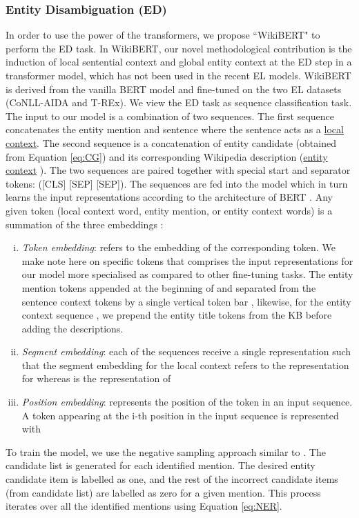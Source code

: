\documentclass[11pt,a4paper]{article}
\begin{document}
\subsubsection{Entity Disambiguation (ED)} \label{sec:entity}
In order to use the power of the transformers, we propose ``WikiBERT" to perform the ED task. In WikiBERT, our novel methodological contribution is the induction of local sentential context and global entity context at the ED step in a transformer model, which has not been used in the recent EL models. WikiBERT is derived from the vanilla BERT model and fine-tuned on the two EL datasets (CoNLL-AIDA and T-REx). 
We view the ED task as sequence classification task. The input to our model is a combination of two sequences. The first sequence  concatenates the entity mention  and sentence  where the sentence acts as a \underline{local context}. The second sequence  is a concatenation of entity candidate (obtained from Equation \ref{eq:CG}) and its corresponding Wikipedia description (\underline{entity context} ). The two sequences are paired together with special start and separator tokens: ([CLS]  [SEP]  [SEP]). The sequences are fed into the model which in turn learns the input representations according to the architecture of BERT \cite{devlin2019bert}. Any given token (local context word, entity mention, or entity context words) is a summation of the three embeddings :
\begin{enumerate}[i.]
    \item \textit{Token embedding}: refers to the embedding of the corresponding token. We make note here on specific tokens that comprises the input representations for our model more specialised as compared to other fine-tuning tasks. The entity mention tokens appended at the beginning of  and separated from the sentence context tokens by a single vertical token bar , likewise, for the entity context sequence , we prepend the entity title tokens from the KB before adding the descriptions.
    \item \textit{Segment embedding}: each of the sequences receive a single representation such that the segment embedding for the local context  refers to the representation for  whereas  is the representation of 
    
    \item \textit{Position embedding}: represents the position of the token in an input sequence. A token appearing at the i-th position in the input sequence is represented with 
\end{enumerate} 
To train the model, we use the negative sampling approach similar to \citet{yamada2019pre}. The candidate list is generated for each identified mention.
The desired entity candidate item is labelled as one, and the rest of the incorrect candidate items (from candidate list) are labelled as zero for a given mention. This process iterates over all the identified mentions using Equation \ref{eq:NER}.
\end{document}
